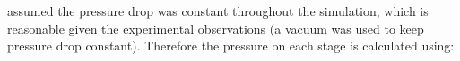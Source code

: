 

assumed the pressure drop was constant throughout the simulation, which is reasonable given the experimental observations (a vacuum was used to keep pressure drop constant). Therefore the pressure on each stage is calculated using:


